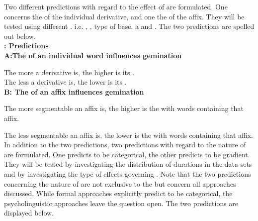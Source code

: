 {{Two different predictions with regard to the effect of  are formulated. One concerns the  of the individual derivative, and one the  of the affix. They will be tested using different . i.e.  , , type of base, a  and . The two predictions are spelled out below.\\


\noindent \textbf{: Predictions}\\
 	

\noindent	\textbf{A:\hspace{0.5cm}The  of an individual word influences gemination} 
   
\noindent  The more  a derivative is, the higher is its . \\

\noindent The less  a derivative is, the lower is its . \\


	



\noindent	\textbf{B: \hspace{0.5cm}The  of an affix influences gemination} 
	
	
\noindent	The more segmentable an affix is, the higher is the  with words containing that affix. 
	
\noindent		The less segmentable an affix is, the lower is the  with words 
		containing that affix. \\
		
		

In addition to the two  predictions, two predictions with regard to the nature of  are formulated. One predicts  to be categorical, the other predicts  to be gradient. They will be tested by investigating the distribution of durations in the data sets and by investigating the type of effects governing . Note that the two predictions concerning the nature of  are not exclusive to the  but concern all approaches discussed. While formal approaches explicitly predict  to be categorical, the psycholinguistic approaches leave the question open. The two predictions are displayed below.\\


}}
